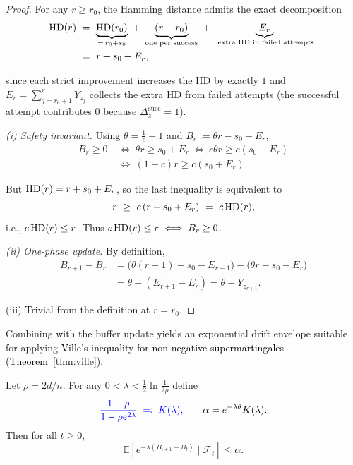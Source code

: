 \begin{proof}
	For any $r\ge r_0$, the Hamming distance admits the exact decomposition
	\begin{align*}
		\HD(r)\ &=\ \underbrace{\HD(r_0)}_{=\,r_0+s_0}\ +\ \underbrace{(r-r_0)}_{\text{one per success}}\ +\ \underbrace{E_r}_{\text{ extra HD in failed attempts}}
		\ \\&=\ r+s_0+E_r,		
	\end{align*}
	
	since each strict improvement increases the HD by exactly $1$ and $E_r=\sum_{j=r_0+1}^r Y_{z_j}$ collects the extra HD from failed attempts (the successful attempt contributes $0$ because $\Delta_z^{\mathrm{succ}}=1$).
	
	\smallskip
	\emph{(i) Safety invariant.}
	Using $\theta=\tfrac{1}{c}-1$ and $B_r:=\theta r - s_0 - E_r$,
	\begin{align*}
		B_r\ge 0
		\ &\Longleftrightarrow\
		\theta r \ge s_0+E_r
		\ \Longleftrightarrow\
		c\theta r \ge c(s_0+E_r)
		\\ &\Longleftrightarrow\
		(1-c)r \ge c(s_0+E_r).	
	\end{align*}
	
	
	But $\text{HD}(r)=r+s_0+E_r$, so the last inequality is equivalent to
	\[
	r \ \ge\ c\,(r+s_0+E_r)\ =\ c\,\HD(r),
	\]
	i.e., $c\,\text{HD}(r)\le r$. Thus $c\,\text{HD}(r)\le r \iff B_r\ge 0$.
	
	\smallskip
	\emph{(ii) One-phase update.}
	By definition,
	\begin{align*}
		B_{r+1}-B_r
		&= \bigl(\theta(r+1)-s_0-E_{r+1}\bigr) - \bigl(\theta r - s_0 - E_r\bigr)
		\\&= \theta - (E_{r+1}-E_r)
		= \theta - Y_{z_{r+1}}.
	\end{align*}
	
	
	
	\smallskip
	(iii) Trivial from the definition at $r=r_0$.
\end{proof}

Combining  with the buffer update yields an exponential drift 
envelope suitable for applying \textcolor{black}{Ville's inequality for non-negative supermartingales (Theorem~\ref{thm:ville}).}

\begin{lemma}
	\label{lem:drift-envelope-global}
	Let $\rho=2d/n$.  
	For any $0<\lambda<\tfrac12\ln\tfrac{1}{2\rho}$ define
	\[
	\textcolor{blue}{\frac{1-\rho}{1-\rho e^{2\lambda}} \;\eqqcolon\; K(\lambda),}
	\qquad 
	\alpha=e^{-\lambda\theta}K(\lambda).
	\]
	Then for all $t\ge0$,
	\[
	\mathbb{E}[e^{-\lambda(B_{t+1}-B_t)}\mid\mathcal{F}_t]\le \alpha.
	\]
\end{lemma}


